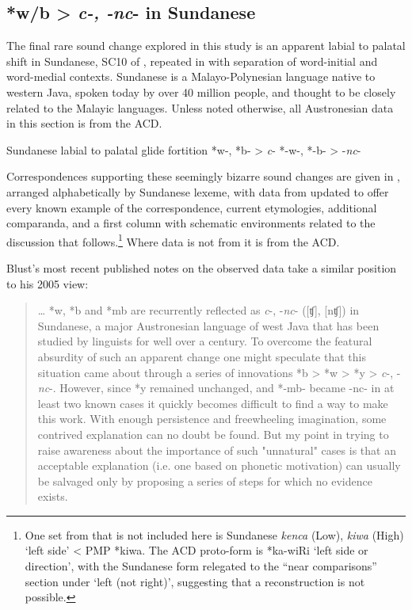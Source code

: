 \documentclass[output=paper]{langscibook}
\begin{document}
\subsection{*w/b > \textit{c-, -nc}- in Sundanese}
\label{sec:blevins:3.5}
The final rare sound change explored in this study is an apparent labial to palatal shift in Sundanese, SC10 of , repeated in  with separation of word-initial  and word-medial  contexts. Sundanese is a Malayo-Polynesian language native to western Java, spoken today by over 40 million people, and thought to be closely related to the Malayic languages. Unless noted otherwise, all Austronesian data in this section is from the ACD.

\ea%
    \label{ex:blevins:16}
    Sundanese labial to palatal glide fortition
  \ea \label{ex:blevins:16a}
  *w-, *b- > \textit{c}-
  \ex \label{ex:blevins:16b}
  *-w-, *-b- > -\textit{nc}-
  \z
\z

Correspondences supporting these seemingly bizarre sound changes are given in , arranged alphabetically by Sundanese lexeme, with data from \citet{Blust2005} updated to offer every known example of the correspondence, current etymologies, additional comparanda, and a first column with schematic environments related to the discussion that follows.\footnote{One set from \citet{Blust2005} that is not included here is Sundanese \textit{kenca} (Low), \textit{kiwa} (High) ‘left side’ < PMP *kiwa. The ACD proto-form is *ka-wiRi ‘left side or direction’, with the Sundanese form relegated to the “near comparisons” section under ‘left (not right)’, suggesting that a reconstruction is not possible.}  Where data is not from \citet{Blust2005, Blust2018} it is from the ACD.

Blust's most recent published notes on the observed data take a similar position to his 2005 view:

\begin{quote}
… *w, *b and *mb are recurrently reflected as \textit{c}-, -\textit{nc}- ([ʧ], [nʧ]) in Sundanese, a major Austronesian language of west Java that has been studied by linguists for well over a century. To overcome the featural absurdity of such an apparent change one might speculate that this situation came about through a series of innovations *b > *w > *y > \textit{c}-, -\textit{nc}-. However, since *y remained unchanged, and *-mb- became -nc- in at least two known cases it quickly becomes difficult to find a way to make this work. With enough persistence and freewheeling imagination, some contrived explanation can no doubt be found. But my point in trying to raise awareness about the importance of such "unnatural" cases is that an acceptable explanation (i.e. one based on phonetic motivation) can usually be salvaged only by proposing a series of steps for which no evidence exists. \citep{Blust2018}
\end{quote}
\end{document}
